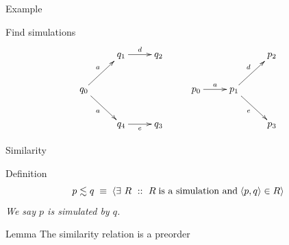 \documentclass[aspectratio=169]{beamer}
\begin{document}
\begin{slide}{Example}

\begin{exampleblock}{\exercise Find simulations}
\begin{equation*}
\xymatrix{
& q_1  \ar[r]^{d} & q_2 &       &        &                              p_2\\
q_0 \ar[ru]^{a} \ar[rd]_{a} &  & & p_0 \ar[r]^{a} & p_1 \ar[ru]^{d} \ar[rd]_{e} & \\
& q_4  \ar[r]_{e} & q_3 &       &        &                              p_3\\
}
\end{equation*}
\end{exampleblock}

\vspace{0.2cm}
\visible<2->{\exerciseBack\begin{equation*}
q_0 \lesssim p_0 \text{\hspace{0.5cm} cf. \hspace{0.3cm}} 
\set{\pair{q_0,p_0}, \pair{q_1,p_1},\pair{q_4,p_1},\alert{\ldots}} %
\end{equation*}}
\end{slide}

\exerciseAdd


\begin{slide}{Similarity}
\small

\begin{block}{Definition}
\centering
\[p \lesssim q\; \equiv\; \rcb{\exists}{R}{}{R\; \text{is a simulation and}\; \pair{p,q} \in R} 
\]
\emph{We say \alert{$p$ is simulated by $q$}.}
\end{block}


\begin{block}{Lemma}
The similarity relation is a preorder\\
\end{block}
\end{slide}
\end{document}
